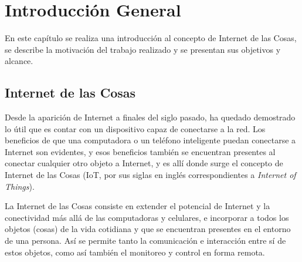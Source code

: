 
\chapter{Introducción General} %

\label{chapter1} %
\label{IntroGeneral}


\newcommand{\keyword}[1]{\textbf{#1}}
\newcommand{\tabhead}[1]{\textbf{#1}}
\newcommand{\code}[1]{\texttt{#1}}
\newcommand{\file}[1]{\texttt{\bfseries#1}}
\newcommand{\option}[1]{\texttt{\itshape#1}}
\newcommand{\grados}{$^{\circ}$}




En este capítulo se realiza una introducción al concepto de Internet de las Cosas, se describe la motivación del trabajo realizado y se presentan sus objetivos y alcance.

\section{Internet de las Cosas{}}

Desde la aparición de Internet a finales del siglo pasado, ha quedado demostrado lo útil que es contar con un dispositivo capaz de conectarse a la red. Los beneficios de que una computadora o un teléfono inteligente puedan conectarse a Internet son evidentes, y esos beneficios también se encuentran presentes al conectar cualquier otro objeto a Internet, y es allí donde surge el concepto de Internet de las Cosas (IoT, por sus siglas en inglés correspondientes a \emph{Internet of Things}).

La Internet de las Cosas consiste en extender el potencial de Internet y la conectividad más allá de las computadoras y celulares, e incorporar a todos los objetos (cosas) de la vida cotidiana y que se encuentran presentes en el entorno de una persona. Así se permite tanto la comunicación e interacción entre sí de estos objetos, como así también el monitoreo y control en forma remota.

